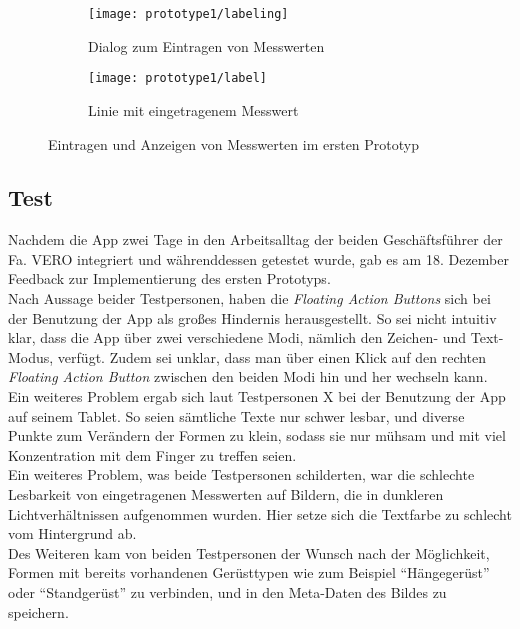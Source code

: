 \begin{figure}[h]
  \begin{subfigure}[t]{0.4\textwidth}
    \texttt{[image: prototype1/labeling]}
    \caption{Dialog zum Eintragen von Messwerten}
    \label{fig:labeling1}
  \end{subfigure}
  \begin{subfigure}[t]{0.4\textwidth}
    \texttt{[image: prototype1/label]}
    \caption{Linie mit eingetragenem Messwert}
    \label{fig:label1}
  \end{subfigure}
  \centering
  \caption{Eintragen und Anzeigen von Messwerten im ersten Prototyp}
\end{figure}

\subsection{Test}\label{subsec:test1}
Nachdem die App zwei Tage in den Arbeitsalltag der beiden Geschäftsführer der Fa. VERO integriert und währenddessen getestet wurde, gab es am 18. Dezember Feedback zur Implementierung des ersten Prototyps. \\

Nach Aussage beider Testpersonen, haben die \emph{Floating Action Buttons} sich bei der Benutzung der App als großes Hindernis herausgestellt.
So sei nicht intuitiv klar, dass die App über zwei verschiedene Modi, nämlich den Zeichen- und Text-Modus, verfügt.
Zudem sei unklar, dass man über einen Klick auf den rechten \emph{Floating Action Button} zwischen den beiden Modi hin und her wechseln kann. \\

Ein weiteres Problem ergab sich laut Testpersonen X  bei der Benutzung der App auf seinem Tablet.
So seien sämtliche Texte nur schwer lesbar, und diverse Punkte zum Verändern der Formen zu klein, sodass sie nur mühsam und mit viel Konzentration mit dem Finger zu treffen seien. \\

Ein weiteres Problem, was beide Testpersonen schilderten, war die schlechte Lesbarkeit von eingetragenen Messwerten auf Bildern, die in dunkleren Lichtverhältnissen aufgenommen wurden.
Hier setze sich die Textfarbe zu schlecht vom Hintergrund ab. \\

Des Weiteren kam von beiden Testpersonen der Wunsch nach der Möglichkeit, Formen mit bereits vorhandenen Gerüsttypen wie zum Beispiel ``Hängegerüst'' oder ``Standgerüst'' zu verbinden, und in den Meta-Daten des Bildes zu speichern. \\

